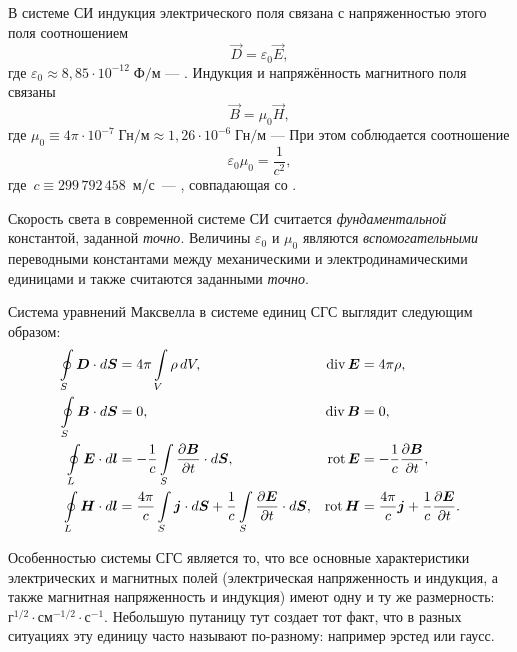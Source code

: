 В системе СИ индукция электрического поля
связана с напряженностью этого поля соотношением
\begin{equation}
	\vec{D} = \varepsilon_0 \vec{E},
\end{equation}
где $\varepsilon_0 \approx 8,85\cdot10^{-12}\;\text{Ф/м}$ ---
. Индукция и напряжённость магнитного поля
связаны
\begin{equation}
	\vec{B} = \mu_0 \vec{H},
\end{equation}
где $\mu_0 \equiv 4\pi\cdot10^{-7}\;\text{Гн/м} \approx
1,26\cdot10^{-6}\;\text{Гн/м}$ --- 
При этом соблюдается соотношение
\begin{equation}
	\varepsilon_0 \mu_0 = \frac{1}{c^2},
\end{equation}
где~$c\equiv 299\,792\,458$~м/с~--- ,
совпадающая со .

Скорость света в современной системе СИ считается \emph{фундаментальной} константой,
заданной \emph{точно}. Величины $\varepsilon_0$ и $\mu_0$ являются
\emph{вспомогательными} переводными константами между механическими и электродинамическими
единицами и также считаются заданными \emph{точно}.

Система уравнений Максвелла в системе единиц СГС выглядит следующим образом:
\begin{equation}
	\eqmark{maxwell-sgs}
	    \begin{aligned}
        \oint\limits_S\vec{D}\cdot d\vec{S} &= 4\pi \int\limits_V\rho\,dV,
        & \Div\vec{E} &= 4\pi \rho, \\
        \oint\limits_S\vec{B}\cdot d\vec{S} &= 0,
        & \Div\vec{B} &= 0, \\
        \oint\limits_L\vec{E}\cdot d\vec{l} &=
        - \frac{1}{c} \int\limits_S\frac{\partial{\vec{B}}} {\partial t}\cdot d\vec{S},
        & \Rot\vec{E} &= -\frac{1}{c}\frac{\partial\vec B}{\partial t}, \\
        \oint\limits_L\vec{H}\cdot d\vec{l} &=
        \frac{4\pi}{c}\int\limits_S\vec{j}\cdot d\vec{S} +
        \frac{1}{c}\int\limits_S\frac{\partial{\vec{E}}}{\partial t}\cdot d\vec{S},
        & \Rot\vec{H} &= \frac{4\pi}{c}\vec{j} + \frac{1}{c}\frac{\partial\vec E}{\partial t}.
    \end{aligned}
\end{equation}

Особенностью системы СГС является то, что все основные характеристики электрических и магнитных полей 
(электрическая напряженность и индукция, а также магнитная напряженность и индукция) имеют одну и ту же размерность:
$г^{1/2} \cdot см^{−1/2} \cdot с^{−1}$. Небольшую путаницу тут создает тот факт, что в разных ситуациях эту единицу часто называют по-разному:
например эрстед или гаусс.

